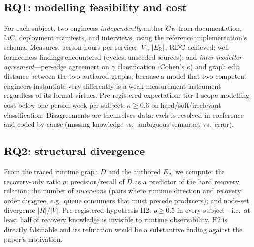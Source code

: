 \subsection{RQ1: modelling feasibility and cost}
\label{sec:rq1}
For each subject, two engineers \emph{independently} author $G_{\mathrm{R}}$ from documentation, IaC, deployment manifests, and interviews, using the reference implementation's schema. Measures: person-hours per service; $|V|$, $|E_{\mathrm{R}}|$, $\mathrm{RDC}$ achieved; well-formedness findings encountered (cycles, unseeded sources); and \emph{inter-modeller agreement}---per-edge agreement on $\gamma$ classification (Cohen's $\kappa$) and graph edit distance between the two authored graphs, because a model that two competent engineers instantiate very differently is a weak measurement instrument regardless of its formal virtues. Pre-registered expectation: tier-1-scope modelling cost below one person-week per subject; $\kappa \geq 0.6$ on hard/soft/irrelevant classification. Disagreements are themselves data: each is resolved in conference and coded by cause (missing knowledge vs.\ ambiguous semantics vs.\ error).

\subsection{RQ2: structural divergence}
\label{sec:rq2}
From the traced runtime graph $D$ and the authored $E_{\mathrm{R}}$ we compute: the recovery-only ratio $\rho$; precision/recall of $D$ as a predictor of the hard recovery relation; the number of \emph{inversions} (pairs where runtime direction and recovery order disagree, e.g.\ queue consumers that must precede producers); and node-set divergence $|R| / |V|$. Pre-registered hypothesis H2: $\rho \geq 0.5$ in every subject---i.e.\ at least half of recovery knowledge is invisible to runtime observability. H2 is directly falsifiable and its refutation would be a substantive finding against the paper's motivation.

